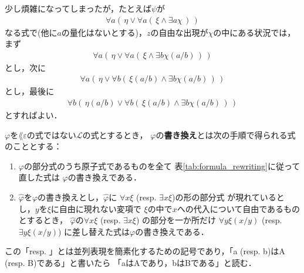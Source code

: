 	少し煩雑になってしまったが，たとえば$\psi$が
	\begin{align}
		\forall a (\, \eta \vee \forall a (\, \xi \wedge \exists a \chi\, )\, )
	\end{align}
	なる式で(他に$a$の量化はないとする)，$z$の自由な出現が$\chi$の中にある状況では，まず
	\begin{align}
		\forall a (\, \eta \vee \forall a (\, \xi \wedge \exists b \chi(a/b)\, )\, )
	\end{align}
	とし，次に
	\begin{align}
		\forall a (\, \eta \vee \forall b (\, \xi(a/b) \wedge \exists b \chi(a/b)\, )\, )
	\end{align}
	とし，最後に
	\begin{align}
		\forall b (\, \eta(a/b) \vee \forall b (\, \xi(a/b) \wedge \exists b \chi(a/b)\, )\, )
	\end{align}
	とすればよい．
	
	\begin{screen}
		\begin{metadfn}[式の書き換え]\label{def:formula_rewriting}
			$\varphi$を$\lang{\varepsilon}$の式ではない$\mathcal{L}$の式とするとき，
			$\varphi$の{\bf 書き換え}とは次の手順で得られる式のこととする：
			\begin{enumerate}
				\item $\varphi$の部分式のうち原子式であるものを全て
					表\ref{tab:formula_rewriting}に従って直した式は
					$\varphi$の書き換えである．
					
				\item $\widehat{\varphi}$を$\varphi$の書き換えとし，$\widehat{\varphi}$に
					$\forall x \xi$ (resp. $\exists x \xi$)の形の部分式\footnotemark
					が現れているとし，$y$を$\xi$に自由に現れない変項で
					$\xi$の中で$x$への代入について自由であるものとするとき，
					$\widehat{\varphi}$の$\forall x \xi$ (resp. $\exists x \xi$)
					の部分を一か所だけ\footnotemark
					$\forall y \xi(x/y)$ (resp. $\exists y \xi(x/y)$)
					に差し替えた式は$\varphi$の書き換えである．
			\end{enumerate}
		\end{metadfn}
	\end{screen}
	この「resp. 」とは並列表現を簡素化するための記号であり，「a (resp. b)はA (resp. B)である」と書いたら
	「aはAであり，bはBである」と読む．
	
	
